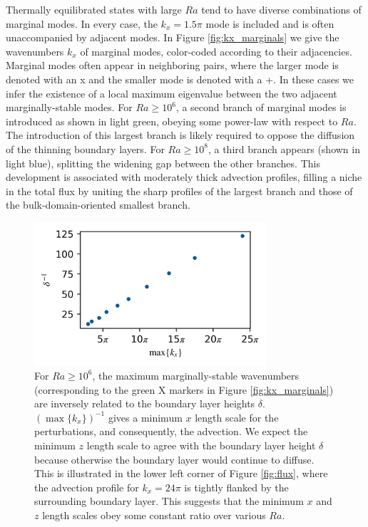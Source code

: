 \documentclass[reprint,amsmath,amssymb,aps]{revtex4-1}
\begin{document}
Thermally equilibrated states with large $Ra$ tend to have diverse combinations of marginal modes. 
In every case, the $k_x = 1.5\pi$ mode is included and is often unaccompanied by adjacent modes. 
In Figure \ref{fig:kx_marginals} we give the wavenumbers $k_x$ of marginal modes, color-coded according to their adjacencies. 
Marginal modes often appear in neighboring pairs, where the larger mode is denoted with an x and the smaller mode is denoted with a +. 
In these cases we infer the existence of a local maximum eigenvalue between the two adjacent marginally-stable modes. 
For $Ra \geq 10^6$, a second branch of marginal modes is introduced as shown in light green, obeying some power-law with respect to $Ra$. 
The introduction of this largest branch is likely required to oppose the diffusion of the thinning boundary layers. 
For $Ra \geq 10^8$, a third branch appears (shown in light blue), splitting the widening gap between the other branches. 
This development is associated with moderately thick advection profiles, filling a niche in the total flux by uniting the sharp profiles of the largest branch and those of the bulk-domain-oriented smallest branch.

\begin{figure}
    \centering
    \includegraphics[width=3.4in]{del_kx_inv.png}
    \caption{For $Ra \geq 10^6$, the maximum marginally-stable wavenumbers (corresponding to the green X markers in Figure \ref{fig:kx_marginals}) are inversely related to the boundary layer heights $\delta$. 
    $(\max \{ k_x \})^{-1}$ gives a minimum $x$ length scale for the perturbations, and consequently, the advection. 
    We expect the minimum $z$ length scale to agree with the boundary layer height $\delta$ because otherwise the boundary layer would continue to diffuse. 
    This is illustrated in the lower left corner of Figure \ref{fig:flux}, where the advection profile for $k_x = 24\pi$ is tightly flanked by the surrounding boundary layer. 
    This suggests that the minimum $x$ and $z$ length scales obey some constant ratio over various $Ra$.}
    \label{fig:del_inv}
\end{figure}
\end{document}
